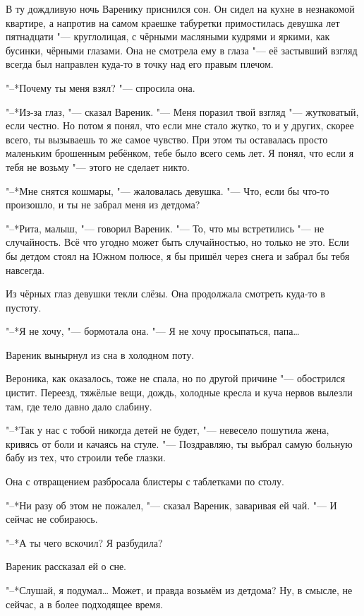 \label{Sat_2012_06_09}

В ту дождливую ночь Варенику приснился сон.
Он сидел на кухне в незнакомой квартире, а напротив на самом краешке табуретки примостилась девушка лет пятнадцати "--- круглолицая, с чёрными масляными кудрями и яркими, как бусинки, чёрными глазами.
Она не смотрела ему в глаза "--- её застывший взгляд всегда был направлен куда-то в точку над его правым плечом.

"--*Почему ты меня взял? "--- спросила она.

"--*Из-за глаз, "--- сказал Вареник.
"--- Меня поразил твой взгляд "--- жутковатый, если честно.
Но потом я понял, что если мне стало жутко, то и у других, скорее всего, ты вызываешь то же самое чувство.
При этом ты оставалась просто маленьким брошенным ребёнком, тебе было всего семь лет.
Я понял, что если я тебя не возьму "--- этого не сделает никто.

"--*Мне снятся кошмары, "--- жаловалась девушка.
"--- Что, если бы что-то произошло, и ты не забрал меня из детдома?

"--*Рита, малыш, "--- говорил Вареник.
"--- То, что мы встретились "--- не случайность.
Всё что угодно может быть случайностью, но только не это.
Если бы детдом стоял на Южном полюсе, я бы пришёл через снега и забрал бы тебя навсегда.

Из чёрных глаз девушки текли слёзы.
Она продолжала смотреть куда-то в пустоту.

"--*Я не хочу, "--- бормотала она.
"--- Я не хочу просыпаться, папа\ldots{}

Вареник вынырнул из сна в холодном поту.

Вероника, как оказалось, тоже не спала, но по другой причине "--- обострился цистит.
Переезд, тяжёлые вещи, дождь, холодные кресла и куча нервов вылезли там, где тело давно дало слабину.

"--*Так у нас с тобой никогда детей не будет, "--- невесело пошутила жена, кривясь от боли и качаясь на стуле.
"--- Поздравляю, ты выбрал самую больную бабу из тех, что строили тебе глазки.

Она с отвращением разбросала блистеры с таблетками по столу.

"--*Ни разу об этом не пожалел, "--- сказал Вареник, заваривая ей чай.
"--- И сейчас не собираюсь.

"--*А ты чего вскочил?
Я разбудила?

Вареник рассказал ей о сне.

"--*Слушай, я подумал\ldots{}
Может, и правда возьмём из детдома?
Ну, в смысле, не сейчас, а в более подходящее время.

